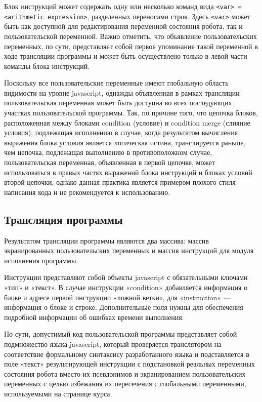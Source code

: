 Блок инструкций может содержать одну или несколько команд вида \lstinline|<var> = <arithmetic expression>|, разделенных переносами строк. Здесь \lstinline|<var>| может быть как доступной для редактирования переменной состояния робота, так и пользовательской переменной. Важно отметить, что объявление пользовательских переменных, по сути, представляет собой первое упоминание такой переменной в ходе трансляции программы и может быть осуществлено только в левой части команды блока инструкций.

Поскольку все пользовательские переменные имеют глобальную область видимости на уровне javascript, однажды объявленная в рамках трансляции пользовательская переменная может быть доступна во всех последующих участках пользовательской программы. Так, по причине того, что цепочка блоков, расположенная между блоками condition (условие) и condition merge (слияние условия), подлежащая исполнению в случае, когда результатом вычисления выражения блока условия является логическая истина, транслируется раньше, чем цепочка, подлежащая выполнению в противоположном случае, пользовательская переменная, объявленная в первой цепочке, может использоваться в правых частях выражений блока инструкций и блоках условий второй цепочки, однако данная практика является примером плохого стиля написания кода и не рекомендуется к использованию.  

\subsection{Трансляция программы}

Результатом трансляции программы являются два массива: массив экранированных пользовательских переменных и массив инструкций для модуля исполнения программы.

Инструкции представляют собой объекты javascript с обязательными ключами «тип» и «текст». В случае инструкции «condition» добавляется информация о блоке и адресе первой инструкции «ложной ветки», для «instruction» — информация о блоке и строке. Дополнительные поля нужны для обеспечения подробной информации об ошибках времени выполнения.

По сути, допустимый код пользовательской программы представляет собой подмножество языка javascript, который проверяется транслятором на соответствие формальному синтаксису разработанного языка и подставляется в поле «текст» результирующей инструкции с подстановкой реальных переменных состояния робота вместо их псевдонимов и экранированием пользовательских переменных с целью избежания их пересечения с глобальными переменными, используемыми на странице курса.


